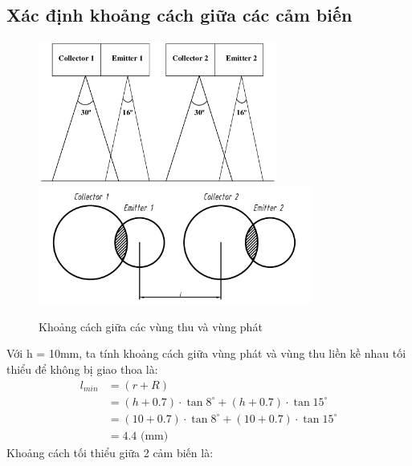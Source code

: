         \subsection{Xác định khoảng cách giữa các cảm biến}
            \begin{figure}[H]
                \centering
                \includegraphics[width=0.7\textwidth]{pictures/chapter4/c4_p7_DistanceCollectorEmitter1.png}
                \label{fig:4-12}
                \includegraphics[width=0.8\textwidth]{pictures/chapter4/c4_p8_DistanceCollectorEmitter2.png}
                \caption{Khoảng cách giữa các vùng thu và vùng phát}
                \label{fig:4-13}
                \end{figure}
            \hspace*{0.6cm}Với h = 10mm, ta tính khoảng cách giữa vùng phát và vùng thu liền kề nhau tối thiểu để không bị giao thoa là:
            \begin{align}
                l_{min} &= (r + R) \label{eq:4-3} \\
                        &= (h +0.7) \cdot \tan{8^{\circ}} + (h + 0.7) \cdot \tan{15^{\circ}} \nonumber \\
                        &= (10 + 0.7) \cdot \tan{8^{\circ}} + (10 + 0.7) \cdot \tan{15^{\circ}} \nonumber \\
                        &= 4.4 \text{ (mm)} \nonumber
            \end{align}
            \hspace*{0.6cm}Khoảng cách tối thiểu giữa 2 cảm biến là:
